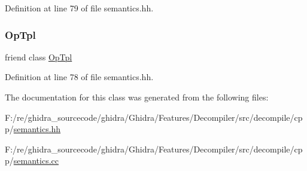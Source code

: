 Definition at line 79 of file semantics.\+hh.

\mbox{\label{class_varnode_tpl_a025636ce30ef2482bde0e65990ce710e}} 
\subsubsection{\texorpdfstring{OpTpl}{OpTpl}}
{\footnotesize\ttfamily friend class \mbox{\hyperlink{class_op_tpl}{Op\+Tpl}}\hspace{0.3cm}{\ttfamily [friend]}}



Definition at line 78 of file semantics.\+hh.



The documentation for this class was generated from the following files\+:\begin{DoxyCompactItemize}
\item 
F\+:/re/ghidra\+\_\+sourcecode/ghidra/\+Ghidra/\+Features/\+Decompiler/src/decompile/cpp/\mbox{\hyperlink{semantics_8hh}{semantics.\+hh}}\item 
F\+:/re/ghidra\+\_\+sourcecode/ghidra/\+Ghidra/\+Features/\+Decompiler/src/decompile/cpp/\mbox{\hyperlink{semantics_8cc}{semantics.\+cc}}\end{DoxyCompactItemize}
